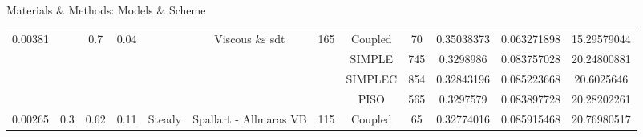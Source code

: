 \documentclass[english,10pt,a4paper,twoside]{beamer}
\begin{document}
\begin{frame}[shrink=55]{Materials \& Methods: Models \& Scheme}
\begin{landscape}
\begin{table}[H]
\begin{tabular}{|cccccccccccc|}
					\multicolumn{1}{|c|}{\multirow{-4}{*}{0.00381}} & \multicolumn{1}{c|}{}                       & \multicolumn{1}{c|}{\multirow{-4}{*}{0.7}}  & \multicolumn{1}{c|}{\multirow{-4}{*}{0.04}} & \multicolumn{1}{c|}{}                          & \multicolumn{1}{c|}{\multirow{-4}{*}{\cellcolor[HTML]{38FFF8}Viscous $k\varepsilon$ sdt}} & \multicolumn{1}{c|}{\multirow{-4}{*}{165}} & \multicolumn{1}{c|}{\cellcolor[HTML]{CE6301}Coupled} & \multicolumn{1}{c|}{70}         & \multicolumn{1}{c|}{0.35038373} & \multicolumn{1}{c|}{0.063271898} & 15.29579044                         \\ \cline{1-1} \cline{3-4} \cline{6-12} 
					\multicolumn{1}{|c|}{}                          & \multicolumn{1}{c|}{}                       & \multicolumn{1}{c|}{}                       & \multicolumn{1}{c|}{}                       & \multicolumn{1}{c|}{}                          & \multicolumn{1}{c|}{\cellcolor[HTML]{68CBD0}}                                             & \multicolumn{1}{c|}{}                      & \multicolumn{1}{c|}{\cellcolor[HTML]{FFCE93}SIMPLE}  & \multicolumn{1}{c|}{745}        & \multicolumn{1}{c|}{0.3298986}  & \multicolumn{1}{c|}{0.083757028} & \cellcolor[HTML]{9AFF99}20.24800881 \\ \cline{8-12} 
					\multicolumn{1}{|c|}{}                          & \multicolumn{1}{c|}{}                       & \multicolumn{1}{c|}{}                       & \multicolumn{1}{c|}{}                       & \multicolumn{1}{c|}{}                          & \multicolumn{1}{c|}{\cellcolor[HTML]{68CBD0}}                                             & \multicolumn{1}{c|}{}                      & \multicolumn{1}{c|}{\cellcolor[HTML]{FE996B}SIMPLEC} & \multicolumn{1}{c|}{854}        & \multicolumn{1}{c|}{0.32843196} & \multicolumn{1}{c|}{0.085223668} & 20.6025646                          \\ \cline{8-12} 
					\multicolumn{1}{|c|}{}                          & \multicolumn{1}{c|}{}                       & \multicolumn{1}{c|}{}                       & \multicolumn{1}{c|}{}                       & \multicolumn{1}{c|}{}                          & \multicolumn{1}{c|}{\cellcolor[HTML]{68CBD0}}                                             & \multicolumn{1}{c|}{}                      & \multicolumn{1}{c|}{\cellcolor[HTML]{F56B00}PISO}    & \multicolumn{1}{c|}{565}        & \multicolumn{1}{c|}{0.3297579}  & \multicolumn{1}{c|}{0.083897728} & 20.28202261                         \\ \cline{8-12} 
					\multicolumn{1}{|c|}{\multirow{-4}{*}{0.00265}} & \multicolumn{1}{c|}{\multirow{-12}{*}{0.3}} & \multicolumn{1}{c|}{\multirow{-4}{*}{0.62}} & \multicolumn{1}{c|}{\multirow{-4}{*}{0.11}} & \multicolumn{1}{c|}{\multirow{-12}{*}{Steady}} & \multicolumn{1}{c|}{\multirow{-4}{*}{\cellcolor[HTML]{68CBD0}Spallart - Allmaras VB}}     & \multicolumn{1}{c|}{\multirow{-4}{*}{115}} & \multicolumn{1}{c|}{\cellcolor[HTML]{CE6301}Coupled} & \multicolumn{1}{c|}{65}         & \multicolumn{1}{c|}{0.32774016} & \multicolumn{1}{c|}{0.085915468} & 20.76980517                         \\ \hline

\end{tabular}
\end{table}
\end{landscape}
\end{frame}
\end{document}
